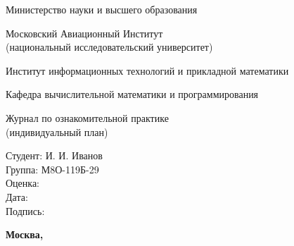 \documentclass[12pt]{article}
\begin{document}
\begin{titlepage}
\begin{center}
\bfseries

{\Large Министерство науки и высшего образования}

\vspace{12pt}

{\Large Московский Авиационный Институт \\ (национальный исследовательский университет)}

\vspace{48pt}

\large Институт информационных технологий и прикладной математики

\vspace{36pt}

\large Кафедра вычислительной математики и программирования

\vspace{72pt}

Журнал по ознакомительной практике \\
(индивидуальный план)

\end{center}

\vspace{180pt}

\begin{flushleft}
Студент: И. И. Иванов \\
Группа: М8О-119Б-29 \\
Оценка: \\
Дата: \\
Подпись:
\end{flushleft}

\vspace*{\fill}

\begin{center}
\bfseries
Москва, \the\year
\end{center}
\end{titlepage}

\pagebreak







\pagebreak
\end{document}
